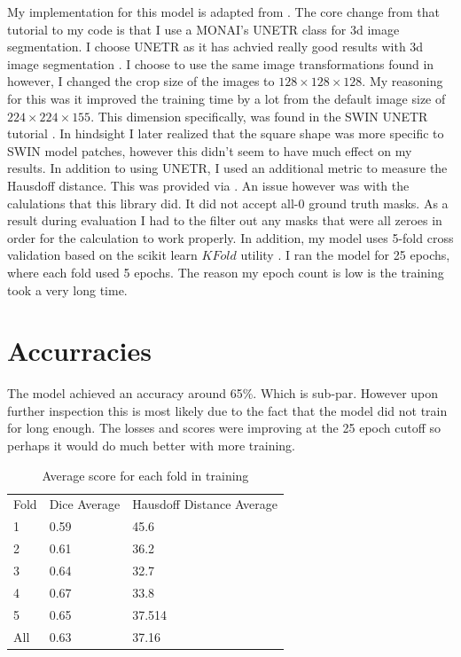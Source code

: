 \documentclass[onecolumn]{article}
\begin{document}
My implementation for this model is adapted from \cite{monaitutorial}. The core change from that tutorial to my code is that I use a MONAI's UNETR class for 3d image segmentation. I choose UNETR as it has achvied really good results with 3d image segmentation \cite{hatamizadeh2021unetr}. I choose to use the same image transformations found in \cite{monaitutorial} however, I changed the crop size of the images to $128\times 128 \times 128$. My reasoning for this was it improved the training time by a lot from the default image size of $224 \times 224 \times 155$. This dimension specifically, was found in the SWIN UNETR tutorial \cite{githubTutorialsswin_unetr_brats21_segmentation_3dipynbMain}. In hindsight I later realized that the square shape was more specific to SWIN model patches, however this didn't seem to have much effect on my results. In addition to using UNETR, I used an additional metric to measure the Hausdoff distance. This was provided via \cite{githubGitHubLolimedpy}. An issue however was with the calulations that this library did. It did not accept all-0 ground truth masks. As a result during evaluation I had to the filter out any masks that were all zeroes in order for the calculation to work properly. In addition, my model uses 5-fold cross validation based on the scikit learn $KFold$ utility \cite{githubMachinelearningarticleshowtousekfoldcrossvalidationwithpytorchmdMain}. I ran the model for 25 epochs, where each fold used 5 epochs. The reason my epoch count is low is the training took a very long time. 

\section{Accurracies}

The model achieved an accuracy around 65\%. Which is sub-par. However upon further inspection this is most likely due to the fact that the model did not train for long enough. The losses and scores were improving at the 25 epoch cutoff so perhaps it would do much better with more training. 

\begin{table}[!ht] \label{tab:1}
\begin{tabular}{lll}
Fold & Dice Average & Hausdoff Distance Average \\
1    & 0.59         & 45.6                      \\
2    & 0.61         & 36.2                      \\
3    & 0.64         & 32.7                      \\
4    & 0.67         & 33.8                      \\
5    & 0.65         & 37.514                    \\
All  & 0.63         & 37.16                     \\
\end{tabular}
\caption{Average score for each fold in training}
\end{table}
\end{document}
